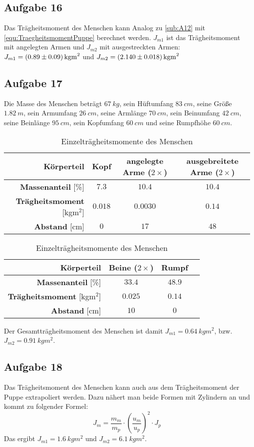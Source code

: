 \documentclass[a4paper,11pt,ngerman]{scrartcl}
\begin{document}
\subsection{Aufgabe 16}
Das Trägheitsmoment des Menschen kann Analog zu \cref{sub:A12} mit \cref{equ:TraegheitsmomentPuppe} berechnet werden. $J_{m1}$ ist das Trägheitsmoment mit angelegten Armen und $J_{m2}$ mit ausgestreckten Armen: $J_{m1} = \SI{0.89 \pm 0.09}{kgm^2}$ und $J_{m2} = \SI{2.14 \pm 0.018}{kgm^2}$

\subsection{Aufgabe 17}
Die Masse des Menschen beträgt $\SI{67}{kg}$, sein Hüftumfang $\SI{83}{cm}$, seine Größe $\SI{1.82}{m}$, sein Armumfang $\SI{26}{cm}$, seine Armlänge $\SI{70}{cm}$, sein Beinumfang $\SI{42}{cm}$, seine Beinlänge $\SI{95}{cm}$, sein Kopfumfang $\SI{60}{cm}$ und seine Rumpfhöhe $\SI{60}{cm}$.
\begin{table}[ht]
\begin{center}\label{tab:Einzeltraegheitsmomente}
\begin{tabular}{r|ccc}\hline
\textbf{Körperteil} & Kopf & angelegte Arme ($2\times$) & ausgebreitete Arme ($2\times$) \\
\hline
\textbf{Massenanteil} [\%] & $7.3$ & $10.4$ & $10.4$ \\
\textbf{Trägheitsmoment} [kgm$^2$] & $0.018$ & $0.0030$ & $0.14$ \\
\textbf{Abstand} [cm] & $0$ & $17$ & $48$ \\
\hline\end{tabular}
\begin{tabular}{r|ccc}\hline
\textbf{Körperteil} & Beine ($2\times$) & Rumpf \\
\hline
\textbf{Massenanteil} [\%] & $33.4$ & $48.9$ \\
\textbf{Trägheitsmoment} [kgm$^2$] & $0.025$ & $0.14$ \\
\textbf{Abstand} [cm] & $10$ & $0$ \\
\hline\end{tabular}
\caption{Einzelträgheitsmomente des Menschen}
\end{center}
\end{table}

Der Gesamtträgheitsmoment des Menschen ist damit $J_{m1} = \SI{0.64}{kgm^2}$, bzw. $J_{m2} = \SI{0.91}{kgm^2}$.

\subsection{Aufgabe 18}
Das Trägheitsmoment des Menschen kann auch aus dem Trägheitsmoment der Puppe extrapoliert werden. Dazu nähert man beide Formen mit Zylindern an und kommt zu folgender Formel:
\begin{equation}
J_m = \frac{m_m}{m_p} \cdot \left(\frac{u_m}{u_p}\right)^2 \cdot J_p
\end{equation}
Das ergibt $J_{m1} = \SI{1.6}{kgm^2}$ und $J_{m2} = \SI{6.1}{kgm^2}$.
\end{document}
